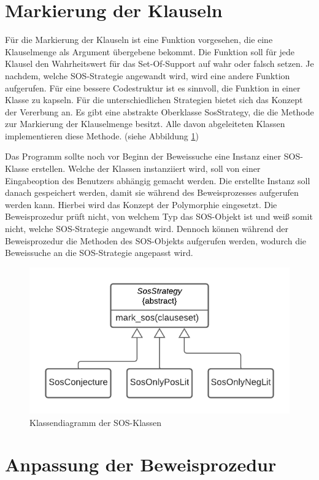 \section{Markierung der Klauseln}
Für die Markierung der Klauseln ist eine Funktion vorgesehen, die eine Klauselmenge als Argument übergebene bekommt. Die Funktion soll für jede Klausel den Wahrheitswert für das Set-Of-Support auf wahr oder falsch setzen. Je nachdem, welche SOS-Strategie angewandt wird, wird eine andere Funktion aufgerufen. Für eine bessere Codestruktur ist es sinnvoll, die Funktion in einer Klasse zu kapseln. Für die unterschiedlichen Strategien bietet sich das Konzept der Vererbung an. Es gibt eine abstrakte Oberklasse SosStrategy, die die Methode zur Markierung der Klauselmenge besitzt. Alle davon abgeleiteten Klassen implementieren diese Methode. (siehe Abbildung \ref{fig:sosstrategy0})

Das Programm sollte noch vor Beginn der Beweissuche eine Instanz einer SOS-Klasse erstellen. Welche der Klassen instanziiert wird, soll von einer Eingabeoption des Benutzers abhängig gemacht werden. Die erstellte Instanz soll danach gespeichert werden, damit sie während des Beweisprozesses aufgerufen werden kann. Hierbei wird das Konzept der Polymorphie eingesetzt. Die Beweisprozedur prüft nicht, von welchem Typ das SOS-Objekt ist und weiß somit nicht, welche SOS-Strategie angewandt wird. Dennoch können während der Beweisprozedur die Methoden des SOS-Objekts aufgerufen werden, wodurch die Beweissuche an die SOS-Strategie angepasst wird.

\begin{figure}
	\centering
	\includegraphics[width=0.7\linewidth]{images/Lucid/SosStrategy0}
	\caption{Klassendiagramm der SOS-Klassen}
	\label{fig:sosstrategy0}
\end{figure}



\section{Anpassung der Beweisprozedur}
